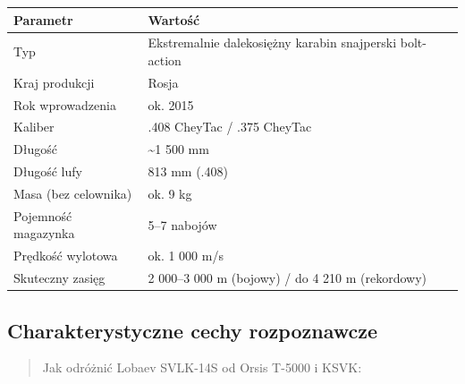\documentclass[12pt,oneside]{book}
\begin{document}
\begin{longtable}[]{@{}ll@{}}
\toprule\noalign{}
Parametr & Wartość \\
\midrule\noalign{}
\endhead
\bottomrule\noalign{}
\endlastfoot
Typ & Ekstremalnie dalekosiężny karabin snajperski bolt-action \\
Kraj produkcji & Rosja \\
Rok wprowadzenia & ok. 2015 \\
Kaliber & .408 CheyTac / .375 CheyTac \\
Długość & \textasciitilde1 500 mm \\
Długość lufy & 813 mm (.408) \\
Masa (bez celownika) & ok. 9 kg \\
Pojemność magazynka & 5--7 nabojów \\
Prędkość wylotowa & ok. 1 000 m/s \\
Skuteczny zasięg & 2 000--3 000 m (bojowy) / do 4 210 m (rekordowy) \\
\end{longtable}

\subsection{Charakterystyczne cechy
rozpoznawcze}\label{charakterystyczne-cechy-rozpoznawcze-82}

\begin{quote}
Jak odróżnić Lobaev SVLK-14S od Orsis T-5000 i KSVK:
\end{quote}
\end{document}
